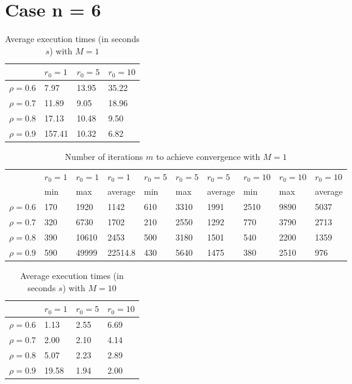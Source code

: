 \documentclass[a4paper,11pt,openright]{report}
\begin{document}
\section*{Case n = 6} 
\begin{table}[H]
\centering
\addtolength{\leftskip}{-1.5cm}
\addtolength{\rightskip}{-1.5cm}
\begin{tabular}{|c|lll|}
\hline
$ $ & $r_0 = 1$ & $r_0 = 5$ & $r_0 = 10$ \\
\hline
$\rho = 0.6$ & 7.97 & 13.95 & 35.22 \\

$\rho = 0.7$ & 11.89 & 9.05 & 18.96 \\

$\rho = 0.8$ & 17.13 & 10.48 & 9.50 \\

$\rho = 0.9$ & 157.41 & 10.32 & 6.82 \\
\hline
\end{tabular}
\caption{Average execution
 times (in seconds $s$) with $M = 1$}
\end{table}
\begin{table}[H]
\centering
\addtolength{\leftskip}{-1.5cm}
\addtolength{\rightskip}{-1.5cm}
\begin{tabular}{|c|lllllllll|}
\hline
$ $ & $r_0 = 1$ & $r_0 = 1$ & $r_0 = 1$ & $r_0 = 5$ & $r_0 = 5$ & $r_0 = 5$ & $r_0 = 10$ & $r_0 = 10$ & $r_0 = 10$  \\
$ $ & min & max & average & min & max & average & min & max & average \\ 
\hline
$\rho = 0.6$ & 170 & 1920 & 1142 & 610 & 3310 & 1991 & 2510 & 9890 & 5037 \\

$\rho = 0.7$ & 320 & 6730 & 1702 & 210 & 2550 & 1292 & 770 & 3790 & 2713\\

$\rho = 0.8$ & 390 & 10610 & 2453 & 500 & 3180 & 1501 & 540 & 2200 & 1359\\

$\rho = 0.9$ & 590 & 49999 & 22514.8 & 430 & 5640 & 1475 & 380 & 2510 & 976\\
\hline
\end{tabular}
\caption{Number of iterations $m$ to achieve convergence with $M = 1$}
\end{table}
\begin{table}[H]
\centering
\addtolength{\leftskip}{-1.5cm}
\addtolength{\rightskip}{-1.5cm}
\begin{tabular}{|c|lll|}
\hline
$ $ & $r_0 = 1$ & $r_0 = 5$ & $r_0 = 10$ \\
\hline
$\rho = 0.6$ & 1.13 & 2.55 & 6.69 \\

$\rho = 0.7$ & 2.00 & 2.10 & 4.14 \\

$\rho = 0.8$ & 5.07 & 2.23 & 2.89 \\

$\rho = 0.9$ & 19.58 & 1.94 & 2.00 \\
\hline
\end{tabular}
\caption{Average execution
 times (in seconds $s$) with $M = 10$}
\end{table}
\end{document}
